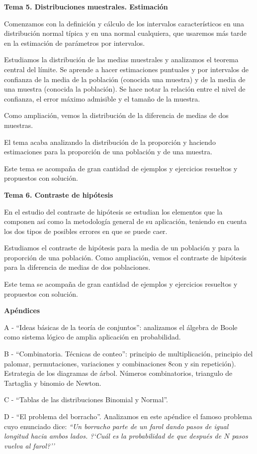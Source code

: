 \textbf{Tema 5. Distribuciones muestrales. Estimación}

\begin{adjustwidth}{50pt}{25pt}
Comenzamos con la definición y cálculo de los intervalos característicos en una distribución normal típica y en una normal cualquiera, que usaremos más tarde en la estimación de parámetros por intervalos.

Estudiamos la distribución de las medias muestrales y analizamos el teorema central del límite. Se aprende a hacer estimaciones puntuales y por intervalos de confianza de la media de la población (conocida una muestra) y de la media de una muestra (conocida la población). Se hace notar la relación entre el nivel de confianza, el error máximo admisible y el tamaño de la muestra.

Como ampliación, vemos la distribución de la diferencia de medias de dos muestras.

El tema acaba analizando la distribución de la proporción y haciendo estimaciones para la proporción de una población y de una muestra.

Este tema se acompaña de gran cantidad de ejemplos y ejercicios resueltos y propuestos con solución.
\end{adjustwidth}

\textbf{Tema 6. Contraste de hipótesis}

\begin{adjustwidth}{50pt}{25pt}

En el estudio del contraste de hipótesis se estudian los elementos que la componen así como la metodología general de su aplicación, teniendo en cuenta los dos tipos de posibles errores en que se puede caer.

Estudiamos el contraste de hipótesis para la media de un población y para la proporción de una población. Como ampliación, vemos el contraste de hipótesis para la diferencia de medias de dos poblaciones.

Este tema se acompaña de gran cantidad de ejemplos y ejercicios resueltos y propuestos con solución.
\end{adjustwidth}

\textbf{Apéndices}

\begin{adjustwidth}{50pt}{25pt}
A - ``Ideas básicas de la teoría de conjuntos'': analizamos el álgebra de Boole como sistema lógico de amplia aplicación en probabilidad.

B - ``Combinatoria. Técnicas de conteo'': principio de multiplicación, principio del palomar, permutaciones, variaciones y combinaciones 8con y sin repetición). Estrategia de los diagramas de árbol. Números combinatorios, triangulo de Tartaglia y binomio de Newton.

C - ``Tablas de las distribuciones Binomial y Normal''.

D - ``El problema del borracho''. Analizamos en este apéndice el famoso problema cuyo enunciado dice: \emph{
``Un borracho parte de un farol dando pasos de igual longitud hacia ambos lados. ?`Cuál es la probabilidad de que después de $N$ pasos vuelva al farol?''
}
\end{adjustwidth}






